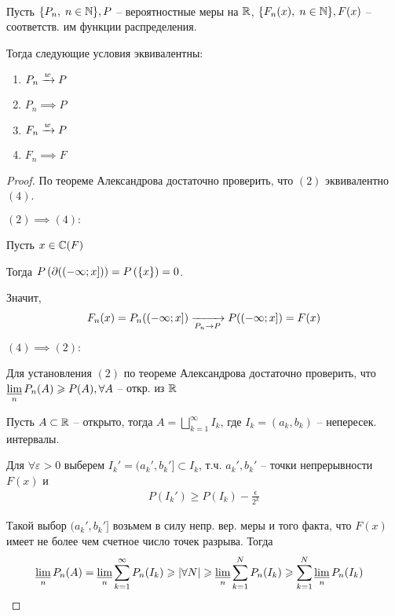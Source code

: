 \begin{theorem}~

  Пусть $\{ P_n,\; n \in \mathbb{N} \}, P$ -- вероятностные меры на $\mathbb{R}$,
  $\{ F_n(x),\; n \in \mathbb{N} \}, F(x)$ -- соответств. им функции распределения. 

  Тогда следующие условия эквивалентны:
  \begin{enumerate}
    \item $P_n \xrightarrow{w} P$
    \item $P_n \implies P$
    \item $F_n \xrightarrow{w} P$
    \item $F_n \implies F$
  \end{enumerate}

  \begin{proof}
    По теореме Александрова достаточно проверить, что $(2)$ эквивалентно $(4)$.

    $(2) \implies (4):$ 

    Пусть $x \in \mathbb{C}(F)$

    Тогда $P\left( \partial((-\infty; x]) \right) = P\left( \{ x \} \right) = 0$.

    Значит,
    \begin{align*}
      F_n(x) = P_n((-\infty; x]) \xrightarrow[P_n \to P]{} P((-\infty; x]) = F(x)
    \end{align*}

    $(4) \implies (2):$ 

    Для установления $(2)$ по теореме Александрова достаточно проверить, 
    что $\varliminf\limits_n P_n(A) \geqslant P(A), \forall A$ -- откр. из $\mathbb{R}$

    Пусть $A \subset \mathbb{R}$ -- открыто, 
    тогда $A = \bigsqcup\limits_{k = 1}^{\infty} I_k$, 
    где $I_k = (a_k, b_k)$ -- непересек. интервалы.

    Для $\forall \varepsilon > 0$
    выберем $I_{k}' = (a_{k}', b_{k}'] \subset I_{k}$,
    т.ч. $a_k', b_k'$ -- точки непрерывности $F(x)$ и
    \begin{align*}
      P(I_k') \geq P(I_k) - \frac{\epsilon}{2^k}
    \end{align*}

    Такой выбор $(a_k', b_k']$ возьмем в силу непр. вер. меры и того факта, 
    что $F(x)$ имеет не более чем счетное  число точек разрыва. 
    Тогда
    \begin{align*}
      &\varliminf\limits_n P_n(A) = \varliminf\limits_n \sum_{k = 1}^{\infty} P_n (I_k) \geqslant |\forall N|
      \geqslant \varliminf\limits_n \sum_{k = 1}^{N} P_n(I_k) \geqslant \sum_{k = 1}^{N} \varliminf\limits_n P_n(I_k)
    \end{align*}


\end{proof}
\end{theorem}
